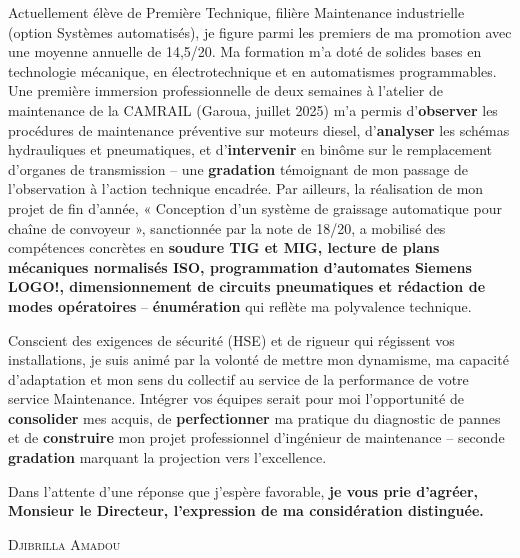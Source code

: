 \documentclass[11pt]{article}
\begin{document}
\begin{exoresolu}
\begin{center}
\begin{minipage}{\linewidth}
Actuellement élève de Première Technique, filière Maintenance industrielle (option Systèmes automatisés), je figure parmi les premiers de ma promotion avec une moyenne annuelle de 14,5/20. Ma formation m'a doté de solides bases en technologie mécanique, en électrotechnique et en automatismes programmables. Une première immersion professionnelle de deux semaines à l'atelier de maintenance de la CAMRAIL (Garoua, juillet 2025) m'a permis d'\textbf{observer} les procédures de maintenance préventive sur moteurs diesel, d'\textbf{analyser} les schémas hydrauliques et pneumatiques, et d'\textbf{intervenir} en binôme sur le remplacement d'organes de transmission -- une \textbf{gradation} témoignant de mon passage de l'observation à l'action technique encadrée. Par ailleurs, la réalisation de mon projet de fin d'année, « Conception d'un système de graissage automatique pour chaîne de convoyeur », sanctionnée par la note de 18/20, a mobilisé des compétences concrètes en \textbf{soudure TIG et MIG, lecture de plans mécaniques normalisés ISO, programmation d'automates Siemens LOGO!, dimensionnement de circuits pneumatiques et rédaction de modes opératoires} -- \textbf{énumération} qui reflète ma polyvalence technique.\par
\vspace{0.2cm}
Conscient des exigences de sécurité (HSE) et de rigueur qui régissent vos installations, je suis animé par la volonté de mettre mon dynamisme, ma capacité d'adaptation et mon sens du collectif au service de la performance de votre service Maintenance. Intégrer vos équipes serait pour moi l'opportunité de \textbf{consolider} mes acquis, de \textbf{perfectionner} ma pratique du diagnostic de pannes et de \textbf{construire} mon projet professionnel d'ingénieur de maintenance -- seconde \textbf{gradation} marquant la projection vers l'excellence.\par
\vspace{0.2cm}
Dans l'attente d'une réponse que j'espère favorable, \textbf{je vous prie d'agréer, Monsieur le Directeur, l'expression de ma considération distinguée.}\par
\vspace{1cm}
\hfill \textsc{Djibrilla Amadou}
\end{minipage}
\end{center}


\end{exoresolu}
\end{document}
